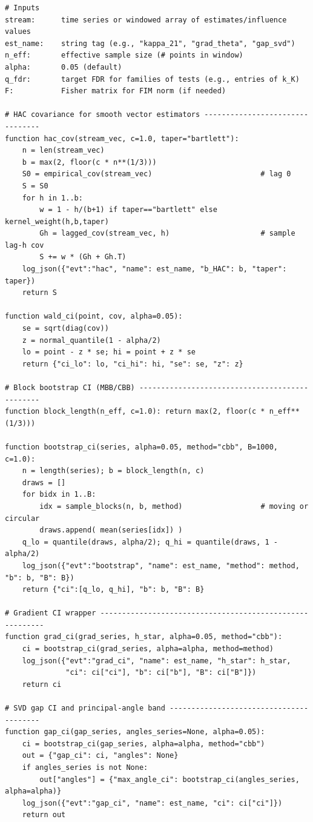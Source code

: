 \documentclass[10pt]{article}
\begin{document}
\begin{lstlisting}
# Inputs
stream:      time series or windowed array of estimates/influence values
est_name:    string tag (e.g., "kappa_21", "grad_theta", "gap_svd")
n_eff:       effective sample size (# points in window)
alpha:       0.05 (default)
q_fdr:       target FDR for families of tests (e.g., entries of k_K)
F:           Fisher matrix for FIM norm (if needed)

# HAC covariance for smooth vector estimators --------------------------------
function hac_cov(stream_vec, c=1.0, taper="bartlett"):
    n = len(stream_vec)
    b = max(2, floor(c * n**(1/3)))
    S0 = empirical_cov(stream_vec)                         # lag 0
    S = S0
    for h in 1..b:
        w = 1 - h/(b+1) if taper=="bartlett" else kernel_weight(h,b,taper)
        Gh = lagged_cov(stream_vec, h)                     # sample lag-h cov
        S += w * (Gh + Gh.T)
    log_json({"evt":"hac", "name": est_name, "b_HAC": b, "taper": taper})
    return S

function wald_ci(point, cov, alpha=0.05):
    se = sqrt(diag(cov))
    z = normal_quantile(1 - alpha/2)
    lo = point - z * se; hi = point + z * se
    return {"ci_lo": lo, "ci_hi": hi, "se": se, "z": z}

# Block bootstrap CI (MBB/CBB) -----------------------------------------------
function block_length(n_eff, c=1.0): return max(2, floor(c * n_eff**(1/3)))

function bootstrap_ci(series, alpha=0.05, method="cbb", B=1000, c=1.0):
    n = length(series); b = block_length(n, c)
    draws = []
    for bidx in 1..B:
        idx = sample_blocks(n, b, method)                  # moving or circular
        draws.append( mean(series[idx]) )
    q_lo = quantile(draws, alpha/2); q_hi = quantile(draws, 1 - alpha/2)
    log_json({"evt":"bootstrap", "name": est_name, "method": method, "b": b, "B": B})
    return {"ci":[q_lo, q_hi], "b": b, "B": B}

# Gradient CI wrapper ---------------------------------------------------------
function grad_ci(grad_series, h_star, alpha=0.05, method="cbb"):
    ci = bootstrap_ci(grad_series, alpha=alpha, method=method)
    log_json({"evt":"grad_ci", "name": est_name, "h_star": h_star,
              "ci": ci["ci"], "b": ci["b"], "B": ci["B"]})
    return ci

# SVD gap CI and principal-angle band ----------------------------------------
function gap_ci(gap_series, angles_series=None, alpha=0.05):
    ci = bootstrap_ci(gap_series, alpha=alpha, method="cbb")
    out = {"gap_ci": ci, "angles": None}
    if angles_series is not None:
        out["angles"] = {"max_angle_ci": bootstrap_ci(angles_series, alpha=alpha)}
    log_json({"evt":"gap_ci", "name": est_name, "ci": ci["ci"]})
    return out


\end{lstlisting}
\end{document}

